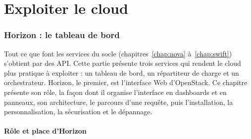 
\part{Exploiter le cloud}\label{part:exploiter}

\section{Horizon : le tableau de bord}\label{chap:horizon}

Tout ce que font les services du socle (chapitres~\ref{chap:nova} à~\ref{chap:swift}) s'obtient par des API. Cette partie
présente trois services qui rendent le cloud plus pratique à exploiter : un tableau de bord, un répartiteur de charge et un
orchestrateur. Horizon, le premier, est l'interface Web d'OpenStack. Ce chapitre présente son rôle, la façon dont il organise
l'interface en dashboards et en panneaux, son architecture, le parcours d'une requête, puis l'installation, la personnalisation,
la sécurisation et le dépannage.

\subsection{Rôle et place d'Horizon}\label{sec:ho-role}

